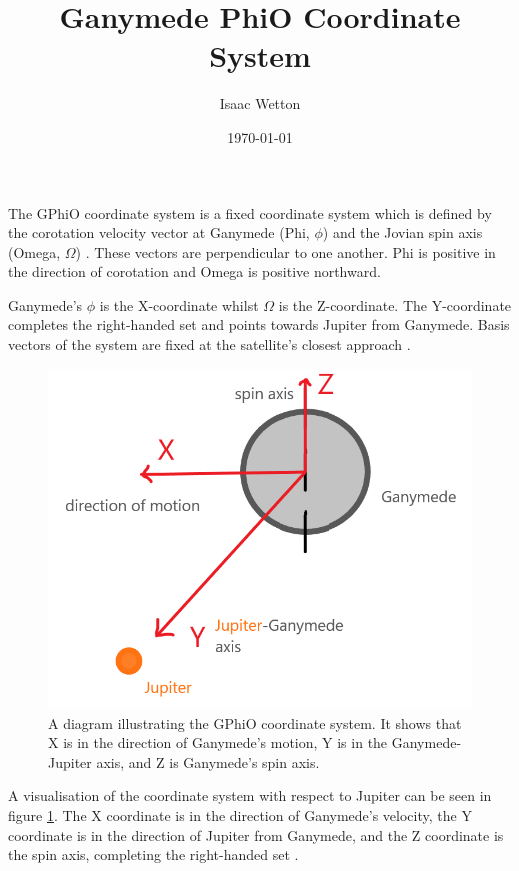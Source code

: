 \documentclass[11pt]{article}
\title{Ganymede PhiO Coordinate System}
\author{Isaac Wetton}
\date{\today}
\begin{document}
\maketitle

\noindent The GPhiO coordinate system is a fixed coordinate system which is defined by the corotation velocity vector at Ganymede (Phi, $\phi$) and the Jovian spin axis (Omega, $\Omega$) \cite{nasagan}. These vectors are perpendicular to one another. Phi is positive in the direction of corotation and Omega is positive northward.

Ganymede's $\phi$ is the X-coordinate whilst $\Omega$ is the Z-coordinate. The Y-coordinate completes the right-handed set and points towards Jupiter from Ganymede. Basis vectors of the system are fixed at the satellite's closest approach \cite{nasagan}.

\begin{figure}[!htb]
    \centering
    \includegraphics[width=12cm]{GPhiO.png}
    \captionsetup{width=13cm}
    \caption{A diagram illustrating the GPhiO coordinate system. It shows that X is in the direction of Ganymede's motion, Y is in the Ganymede-Jupiter axis, and Z is Ganymede's spin axis.}
    \label{fig:GPhiO}
\end{figure}

\noindent A visualisation of the coordinate system with respect to Jupiter can be seen in figure \ref{fig:GPhiO}. The X coordinate is in the direction of Ganymede's velocity, the Y coordinate is in the direction of Jupiter from Ganymede, and the Z coordinate is the spin axis, completing the right-handed set \cite{flybylines}.



\end{document}
